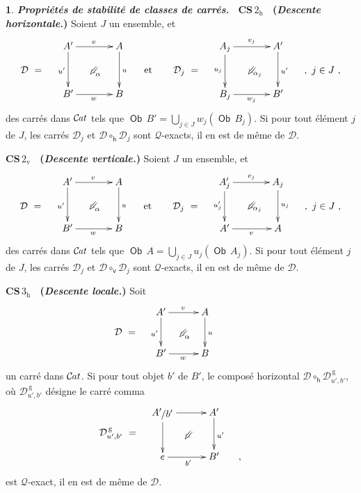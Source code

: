 \documentclass[francais]{smfart}
\theoremstyle{plain}
\theoremstyle{remark}
\theoremstyle{definition}
\newtheorem{paragr}[thm]{}
\numberwithin{equation}{thm}
\begin{document}
\begin{paragr} {\emph{\textbf{{Propriétés de stabilité de classes de carrés}.\ }}}
\noindent
\textbf{\boldmath CS\,$2_{\mathrm h}$ \ (\emph{Descente horizontale.})} Soient $J$ un ensemble, et 
\[
\xymatrixrowsep{.7pc}
\xymatrixcolsep{1.3pc}
\UseAllTwocells
\xymatrix{
&A'\ddrrcompositemap<\omit>{\alpha}
  \ar[rr]^{v}
  \ar[dd]_{u'}
&&A\ar[dd]^u
&&&A_j\ddrrcompositemap<\omit>{\ \alpha_j}
  \ar[rr]^{v_j}
  \ar[dd]_{u_j}
&&A'\ar[dd]^{u'}
\\
{\mathcal D}\ =
&&&&\hbox{et}
&{\mathcal D_j}\ =
&&&&,\ j\in J\ ,
\\
&B'\ar[rr]_w
&&B
&&&B_j\ar[rr]_{w_j}
&&B'
}
\]
des carrés dans ${{\mathcal{C} \mspace{-2.mu} \it{at}}}$ tels que ${\operatorname{\mathsf{Ob}}}\,B'=\bigcup\limits_{j\in J}w_j({\operatorname{\mathsf{Ob}}}\,B_j)$. Si pour tout élément $j$ de $J$, les carrés $\mathcal D_j$ et $\mathcal D{\circ^{}_{\mathsf h}}\mathcal D_j$ sont ${\mathcal{Q}}${\nobreakdash}-exacts, il en est de même de $\mathcal D$.
\smallbreak

\noindent
\textbf{\boldmath CS\,$2_{\mathrm v}$ \ (\emph{Descente verticale.})} Soient $J$ un ensemble, et 
\[
\xymatrixrowsep{.7pc}
\xymatrixcolsep{1.3pc}
\UseAllTwocells
\xymatrix{
&A'\ddrrcompositemap<\omit>{\alpha}
  \ar[rr]^{v}
  \ar[dd]_{u'}
&&A\ar[dd]^u
&&&A'_j\ddrrcompositemap<\omit>{\ \alpha_j}
  \ar[rr]^{v_j}
  \ar[dd]_{u'_j}
&&A_j\ar[dd]^{u_j}
\\
{\mathcal D}\ =
&&&&\hbox{et}
&{\mathcal D_j}\ =
&&&&,\ j\in J\ ,
\\
&B'\ar[rr]_w
&&B
&&&A'\ar[rr]_{v}
&&A
}
\]
des carrés dans ${{\mathcal{C} \mspace{-2.mu} \it{at}}}$ tels que ${\operatorname{\mathsf{Ob}}}\,A=\bigcup\limits_{j\in J}u_j({\operatorname{\mathsf{Ob}}}\,A_j)$. Si pour tout élément $j$ de $J$, les carrés $\mathcal D_j$ et $\mathcal D{\circ^{}_{\mathsf v}}\mathcal D_j$ sont ${\mathcal{Q}}${\nobreakdash}-exacts, il en est de même de $\mathcal D$.
\smallbreak

\noindent
\textbf{\boldmath CS\,$3_{\mathrm h}$ \ (\emph{Descente locale.})} Soit 
\[
\mathcal{D}\ =\quad
\raise 23pt
\vbox{
\UseTwocells
\xymatrixcolsep{2.5pc}
\xymatrixrowsep{2.4pc}
\xymatrix{
A'\ar[d]_{u'}\ar[r]^{v}
\drtwocell<\omit>{\alpha}
&A\ar[d]^{u}
\\
B'\ar[r]_{w}
&B
&\hskip -30pt
}
}
\] 
un carré dans ${{\mathcal{C} \mspace{-2.mu} \it{at}}}$. Si pour tout objet $b'$ de $B'\!$, le composé horizontal $\mathcal D{\circ^{}_{\mathsf h}} \mathcal{D}^{\mathrm{\,g}}_{u',b'}$, où $\mathcal{D}^{\mathrm{\,g}}_{u',b'}$ désigne le carré comma
\[
\hskip 15pt
\mathcal{D}_{u',b'}^{\mathrm{\,g}}\ =\quad
\raise 23pt
\vbox{
\UseTwocells
\xymatrixcolsep{2.5pc}
\xymatrixrowsep{2.4pc}
\xymatrix{
{\mathchoice {{A'}\raise -1.8pt\vbox{\hbox{$\kern -.8pt/{b'}$}}} {{A'}\raise -1.8pt\vbox{\hbox{$\kern -.8pt/{b'}$}}\kern .8pt} {{A'}\raise -1.8pt\vbox{\hbox{$\scriptstyle\kern -.8pt /{b'}$}}} {{A'}\raise -1.8pt\vbox{\hbox{$\scriptscriptstyle\kern -.8pt /{b'}$}}} }\ar[d]_{}\ar[r]^{}
\drtwocell<\omit>{}
&A'\ar[d]^{u'}
\\
e\ar[r]_{b'}
&B'
&\hskip -30pt,
}
}\qquad
\]
est ${\mathcal{Q}}$-exact, il en est de même de $\mathcal D$.
\smallbreak


\end{paragr}
\end{document}
